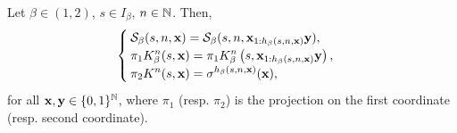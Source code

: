 \begin{lemma}\label{lem:the random beta expansion algorithm reads only the first bits of its input}
    Let $\beta \in (1,2)$, $s \in I_\beta$, $n \in \mathbb{N}$. Then,
    \begin{equation}
        \begin{cases}
            \mathcal{S}_\beta(s,n,{\bf x}) = \mathcal{S}_\beta(s,n,{\bf x}_{1:h_\beta(s,n,{\bf x})}{\bf y}),\\
            \displaystyle \pi_1 K^n_\beta(s,{\bf x}) = \pi_1 K^n_\beta\left(s,{\bf x}_{1:h_\beta(s,n,{\bf x})}{\bf y}\right),\\
            \displaystyle \pi_2 K^n(s,{\bf x}) = \sigma^{h_\beta(s,n,{\bf x})}({\bf x}),
        \end{cases}
    \end{equation}
    for all ${\bf x}, {\bf y} \in \{0,1\}^{\mathbb{N}}$, where $\pi_1$ (resp. $\pi_2$) is the projection on the first coordinate (resp. second coordinate).
\end{lemma}
